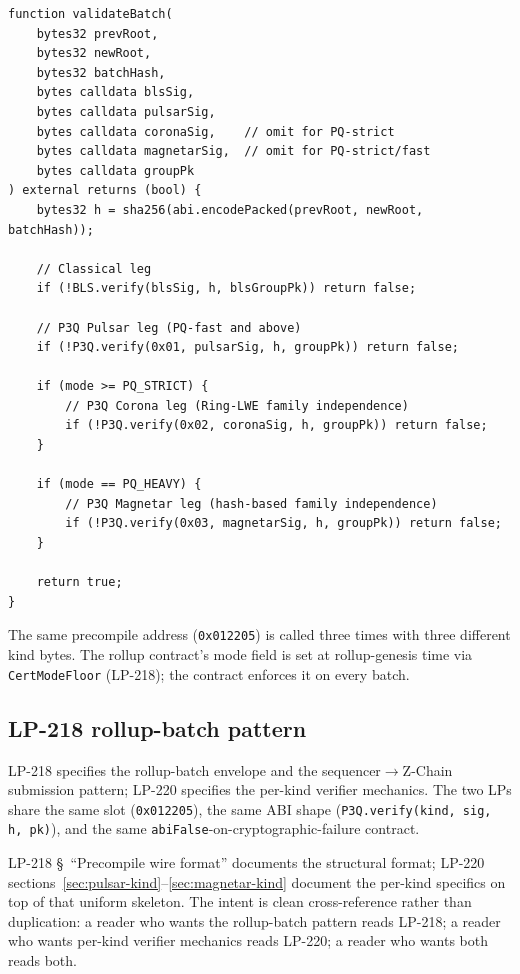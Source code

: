 \begin{lstlisting}[language={}]
function validateBatch(
    bytes32 prevRoot,
    bytes32 newRoot,
    bytes32 batchHash,
    bytes calldata blsSig,
    bytes calldata pulsarSig,
    bytes calldata coronaSig,    // omit for PQ-strict
    bytes calldata magnetarSig,  // omit for PQ-strict/fast
    bytes calldata groupPk
) external returns (bool) {
    bytes32 h = sha256(abi.encodePacked(prevRoot, newRoot, batchHash));

    // Classical leg
    if (!BLS.verify(blsSig, h, blsGroupPk)) return false;

    // P3Q Pulsar leg (PQ-fast and above)
    if (!P3Q.verify(0x01, pulsarSig, h, groupPk)) return false;

    if (mode >= PQ_STRICT) {
        // P3Q Corona leg (Ring-LWE family independence)
        if (!P3Q.verify(0x02, coronaSig, h, groupPk)) return false;
    }

    if (mode == PQ_HEAVY) {
        // P3Q Magnetar leg (hash-based family independence)
        if (!P3Q.verify(0x03, magnetarSig, h, groupPk)) return false;
    }

    return true;
}
\end{lstlisting}

The same precompile address (\texttt{0x012205}) is called
three times with three different kind bytes. The rollup
contract's mode field is set at rollup-genesis time via
\texttt{CertModeFloor} (LP-218); the contract enforces it on
every batch.

\subsection{LP-218 rollup-batch pattern}

LP-218 specifies the rollup-batch envelope and the
sequencer$\to$Z-Chain submission pattern; LP-220 specifies the
per-kind verifier mechanics. The two LPs share the same slot
(\texttt{0x012205}), the same ABI shape
(\texttt{P3Q.verify(kind, sig, h, pk)}), and the same
\texttt{abiFalse}-on-cryptographic-failure contract.

LP-218 \S~``Precompile wire format'' documents the structural
format; LP-220 sections~\ref{sec:pulsar-kind}--\ref{sec:magnetar-kind}
document the per-kind specifics on top of that uniform skeleton.
The intent is clean cross-reference rather than duplication: a
reader who wants the rollup-batch pattern reads LP-218; a reader
who wants per-kind verifier mechanics reads LP-220; a reader who
wants both reads both.

